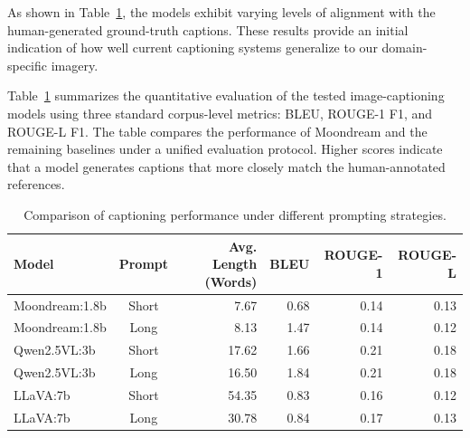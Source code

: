 \documentclass[runningheads]{llncs}
\begin{document}
As shown in Table~\ref{tab:results}, the models exhibit varying levels of alignment with the human-generated ground-truth captions. These results provide an initial indication of how well current captioning systems generalize to our domain-specific imagery.

Table~\ref{tab:results} summarizes the quantitative evaluation of the tested image-captioning models using three standard corpus-level metrics: BLEU, ROUGE-1 F1, and ROUGE-L F1. The table compares the performance of Moondream and the remaining baselines under a unified evaluation protocol. Higher scores indicate that a model generates captions that more closely match the human-annotated references.

\begin{table}[t]
\centering
\caption{Comparison of captioning performance under different prompting strategies.}
\label{tab:results}
\begin{tabular}{lcrrrr}
\toprule
\textbf{Model} & \textbf{Prompt} & \textbf{Avg. Length (Words)} &  \textbf{BLEU} & \textbf{ROUGE-1} & \textbf{ROUGE-L} \\
\midrule
Moondream:1.8b & Short  & 7.67 & 0.68 & 0.14 & 0.13 \\
Moondream:1.8b     & Long & 8.13 & 1.47   & 0.14 & 0.12    \\

Qwen2.5VL:3b     & Short & 17.62 &  1.66  & 0.21 & 0.18    \\
Qwen2.5VL:3b     & Long & 16.50 &  1.84  & 0.21 & 0.18    \\


LLaVA:7b     & Short & 54.35 &  0.83  & 0.16 & 0.12    \\
LLaVA:7b     & Long & 30.78 &  0.84  & 0.17 & 0.13    \\
\bottomrule
\end{tabular}
\end{table}
\end{document}
